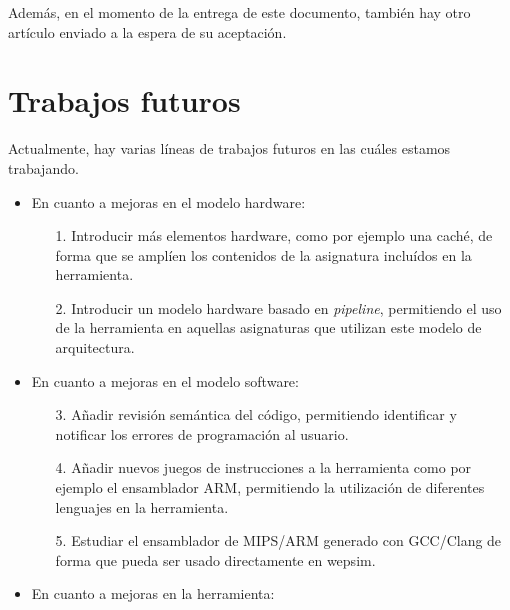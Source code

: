 Además, en el momento de la entrega de este documento, también hay otro artículo enviado a la espera de su aceptación.

\vspace{1cm}

\section{Trabajos futuros}

Actualmente, hay varias líneas de trabajos futuros en las cuáles estamos trabajando.

\begin{itemize}

\item En cuanto a mejoras en el modelo \gls{hardware}:

\begin{itemize}

\item[1.] Introducir más elementos \gls{hardware}, como por ejemplo una caché, de forma que se amplíen los contenidos de la asignatura incluídos en la herramienta.

\item[2.] Introducir un modelo \gls{hardware} basado en \textit{\gls{pipeline}}, permitiendo el uso de la herramienta en aquellas asignaturas que utilizan este modelo de arquitectura. 

\end{itemize}

\item En cuanto a mejoras en el modelo \gls{software}:

\begin{itemize}

\item[3.] Añadir revisión semántica del código, permitiendo identificar y notificar los errores de programación al usuario.

\item[4.] Añadir nuevos juegos de instrucciones a la herramienta como por ejemplo el \gls{ensamblador} ARM, permitiendo la utilización de diferentes lenguajes en la herramienta.

\item[5.] Estudiar el \gls{ensamblador} de MIPS/ARM generado con GCC/Clang de forma que pueda ser usado directamente en \acrshort{wepsim}.

\end{itemize}

\item En cuanto a mejoras en la herramienta:


\end{itemize}
